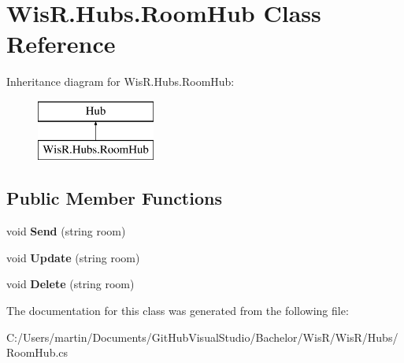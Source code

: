 \hypertarget{class_wis_r_1_1_hubs_1_1_room_hub}{}\section{Wis\+R.\+Hubs.\+Room\+Hub Class Reference}
\label{class_wis_r_1_1_hubs_1_1_room_hub}
Inheritance diagram for Wis\+R.\+Hubs.\+Room\+Hub\+:\begin{figure}[H]
\begin{center}
\leavevmode
\includegraphics[height=2.000000cm]{class_wis_r_1_1_hubs_1_1_room_hub}
\end{center}
\end{figure}
\subsection*{Public Member Functions}
\begin{DoxyCompactItemize}
\item 
\hypertarget{class_wis_r_1_1_hubs_1_1_room_hub_a1261e96c07c4543d5b8c9c9c65b9978d}{}void {\bfseries Send} (string room)\label{class_wis_r_1_1_hubs_1_1_room_hub_a1261e96c07c4543d5b8c9c9c65b9978d}

\item 
\hypertarget{class_wis_r_1_1_hubs_1_1_room_hub_a72521d6399d9b3b1efc4aed31c620648}{}void {\bfseries Update} (string room)\label{class_wis_r_1_1_hubs_1_1_room_hub_a72521d6399d9b3b1efc4aed31c620648}

\item 
\hypertarget{class_wis_r_1_1_hubs_1_1_room_hub_ad7b329e369b8de95a6b6a28fef30b217}{}void {\bfseries Delete} (string room)\label{class_wis_r_1_1_hubs_1_1_room_hub_ad7b329e369b8de95a6b6a28fef30b217}

\end{DoxyCompactItemize}


The documentation for this class was generated from the following file\+:\begin{DoxyCompactItemize}
\item 
C\+:/\+Users/martin/\+Documents/\+Git\+Hub\+Visual\+Studio/\+Bachelor/\+Wis\+R/\+Wis\+R/\+Hubs/Room\+Hub.\+cs\end{DoxyCompactItemize}
